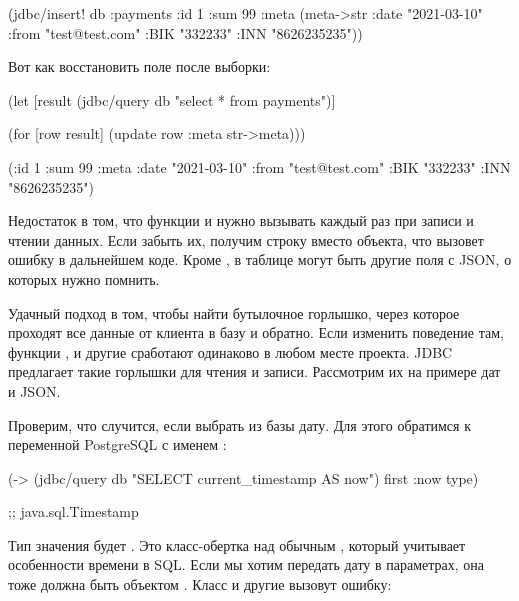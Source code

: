 \begin{english}
  \begin{clojure}
(jdbc/insert!
 db
 :payments
 {:id 1
  :sum 99
  :meta (meta->str
          {:date "2021-03-10"
           :from "test@test.com"
           :BIK "332233"
           :INN "8626235235"})})
  \end{clojure}
\end{english}

Вот как восстановить поле  после выборки:

\begin{english}
  \begin{clojure}
(let [result
      (jdbc/query db "select * from payments")]

  (for [row result]
    (update row :meta str->meta)))

({:id 1
  :sum 99
  :meta {:date "2021-03-10"
         :from "test@test.com"
         :BIK "332233"
         :INN "8626235235"}})
  \end{clojure}
\end{english}

Недостаток в том, что функции  и  нужно вызывать каждый раз при записи и чтении данных. Если забыть их, получим строку вместо объекта, что вызовет ошибку в дальнейшем коде. Кроме , в таблице могут быть другие поля с JSON, о которых нужно помнить.

Удачный подход в том, чтобы найти бутылочное горлышко, через которое проходят все данные от клиента в базу и обратно. Если изменить поведение там, функции ,  и другие сработают одинаково в любом месте проекта. JDBC предлагает такие горлышки для чтения и записи. Рассмотрим их на примере дат и JSON.

Проверим, что случится, если выбрать из базы дату. Для этого обратимся к переменной PostgreSQL с именем :

\begin{english}
  \begin{clojure}
(-> (jdbc/query db "SELECT current_timestamp AS now")
    first
    :now
    type)

;; java.sql.Timestamp
  \end{clojure}
\end{english}

Тип значения будет . Это класс-обертка над обычным , который учитывает особенности времени в SQL. Если мы хотим передать дату в параметрах, она тоже должна быть объектом . Класс  и другие вызовут ошибку:

